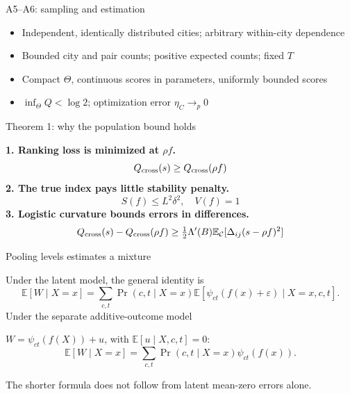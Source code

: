 \documentclass[11pt,aspectratio=169]{beamer}
\begin{document}
\begin{frame}[label=sampling]{A5--A6: sampling and estimation}
\begin{itemize}
\item Independent, identically distributed cities; arbitrary within-city dependence
\item Bounded city and pair counts; positive expected counts; fixed $T$
\item Compact $\Theta$, continuous scores in parameters, uniformly bounded scores
\item $\inf_\Theta Q<\log2$; optimization error $\eta_C\to_p0$
\end{itemize}\par\vfill\hyperlink{s15}{}
\end{frame}

\begin{frame}[label=proof]{Theorem 1: why the population bound holds}

\textbf{1. Ranking loss is minimized at $\rho f$.}
\[
Q_{\rm cross}(s)\ge Q_{\rm cross}(\rho f)
\]
\textbf{2. The true index pays little stability penalty.}
\[
S(f)\le L^2\delta^2,\quad V(f)=1
\]
\textbf{3. Logistic curvature bounds errors in differences.}
\[
Q_{\rm cross}(s)-Q_{\rm cross}(\rho f)
\ge\tfrac12\Lambda'(B)\mathbb E_{\mathcal C}[\Delta_{ij}(s-\rho f)^2]
\]
\hfill\hyperlink{s14}{}

\end{frame}

\begin{frame}[label=b4]{Pooling levels estimates a mixture}

Under the latent model, the general identity is
\[
\mathbb E[W\mid X=x]=\sum_{c,t}\Pr(c,t\mid X=x)
\mathbb E[\psi_{ct}(f(x)+\varepsilon)\mid X=x,c,t].
\]
\medskip
Under the separate additive-outcome model\par
$W=\psi_{ct}(f(X))+u$, with $\mathbb E[u\mid X,c,t]=0$:
\[
\mathbb E[W\mid X=x]=\sum_{c,t}\Pr(c,t\mid X=x)\psi_{ct}(f(x)).
\]
\par\vfill\small The shorter formula does not follow from latent mean-zero errors alone.

\note{}
\end{frame}
\end{document}
